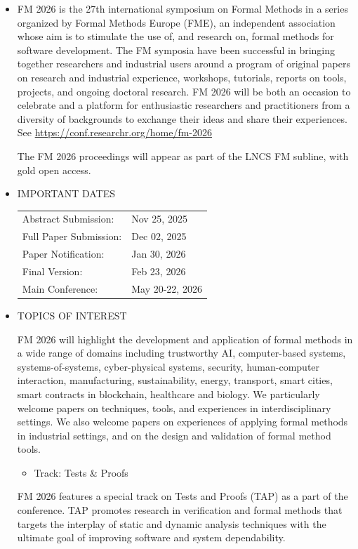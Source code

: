 \documentclass[prodmode,acmtecs]{acmsmall} %
\begin{document}
\begin{itemize}\item  FM 2026 is the 27th international symposium on Formal Methods in a series organized by Formal Methods Europe (FME), an independent association whose aim is to stimulate the use of, and research on, formal methods for software development. The FM symposia have been successful in bringing together researchers and industrial users around a program of original papers on research and industrial experience, workshops, tutorials, reports on tools, projects, and ongoing doctoral research. FM 2026 will be both an occasion to celebrate and a platform for enthusiastic researchers and practitioners from a diversity of backgrounds to exchange their ideas and share their experiences. See \href{https://conf.researchr.org/home/fm-2026}{https://conf.researchr.org/home/fm-2026} 
 
  The FM 2026 proceedings will appear as part of the LNCS FM subline, with gold open access. 
 
\item  IMPORTANT DATES 
 
\begin{tabulary}{\linewidth}{LL}Abstract Submission:  & Nov 25, 2025 \\
Full Paper Submission:  & Dec 02, 2025 \\
Paper Notification:  & Jan 30, 2026 \\
Final Version:  & Feb 23, 2026 \\
Main Conference:  & May 20-22, 2026 \\
\end{tabulary}
 
\item  TOPICS OF INTEREST  
 
  FM 2026 will highlight the development and application of formal methods in a wide range of domains including trustworthy AI, computer-based systems, systems-of-systems, cyber-physical systems, security, human-computer interaction, manufacturing, sustainability, energy, transport, smart cities, smart contracts in blockchain, healthcare and biology. We particularly welcome papers on techniques, tools, and experiences in interdisciplinary settings. We also welcome papers on experiences of applying formal methods in industrial settings, and on the design and validation of formal method tools. 
 
\begin{itemize}\item  Track: Tests \& Proofs
\end{itemize} 
  FM 2026 features a special track on Tests and Proofs (TAP) as a part of the conference. TAP promotes research in verification and formal methods that targets the interplay of static and dynamic analysis techniques with the ultimate goal of improving software and system dependability. 
 

\end{itemize}
\end{document}
